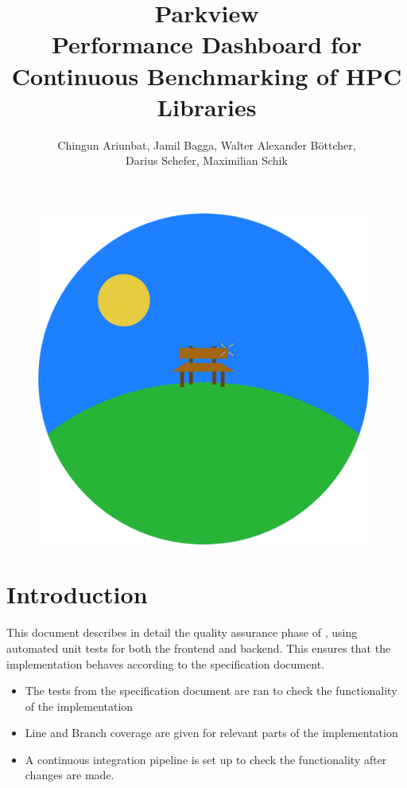 \documentclass[parskip=full,11pt]{scrartcl}
\title{\Huge Parkview\\
    \LARGE \normalfont Performance Dashboard for Continuous Benchmarking of HPC Libraries}
\author{Chingun Ariunbat, Jamil Bagga, Walter Alexander B\"ottcher,\\Darius Schefer, Maximilian Schik}
\begin{document}
\maketitle
\begin{figure}[h]
	\includegraphics[width=11cm]{parkview.png}
	\centering
\end{figure}

\thispagestyle{empty}

\clearpage
{}

\tableofcontents
\clearpage

\section{Introduction}
This document describes in detail the quality assurance phase of \parkview{}, using automated unit tests for both the frontend and backend. This ensures that the implementation behaves according to the specification document.
\begin{itemize}
  \item The tests from the specification document are ran to check the functionality of the implementation
  \item Line and Branch coverage are given for relevant parts of the implementation
  \item A continuous integration pipeline is set up to check the functionality after changes are made.
\end{itemize}
\clearpage


\clearpage


\clearpage


\clearpage


\clearpage


\appendix

\end{document}
